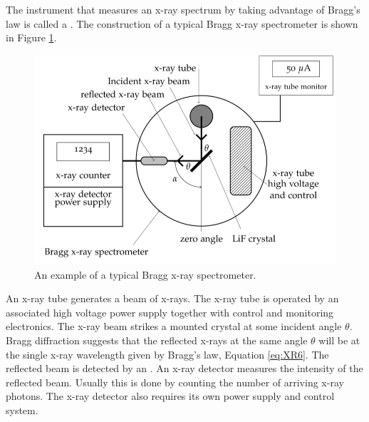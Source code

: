 \documentclass[12pt, a4paper, oneside, openright, titlepage]{book}
\begin{document}
\noindent The instrument that measures an x-ray spectrum by taking advantage of Bragg’s law is called a . The construction of a typical Bragg x-ray spectrometer is shown in Figure \ref{fig:XR8}.

\begin{figure}[H]
    \centering
    \includegraphics[scale = 0.8]{Images/XR8.PNG}
    \caption{An example of a typical Bragg x-ray spectrometer.}
    \label{fig:XR8}
\end{figure}

\noindent An x-ray tube generates a beam of x-rays. The x-ray tube is operated by an associated high voltage power supply together with control and monitoring electronics. The x-ray beam strikes a mounted crystal at some incident angle $\theta$. Bragg diffraction suggests that the reflected x-rays at the same angle $\theta$ will be at the single x-ray wavelength given by Bragg’s law, Equation \ref{eq:XR6}. The reflected beam is detected by an . An x-ray detector measures the intensity of the reflected beam. Usually this is done by counting the number of arriving x-ray photons. The x-ray detector also requires its own power supply and control system.
\end{document}
